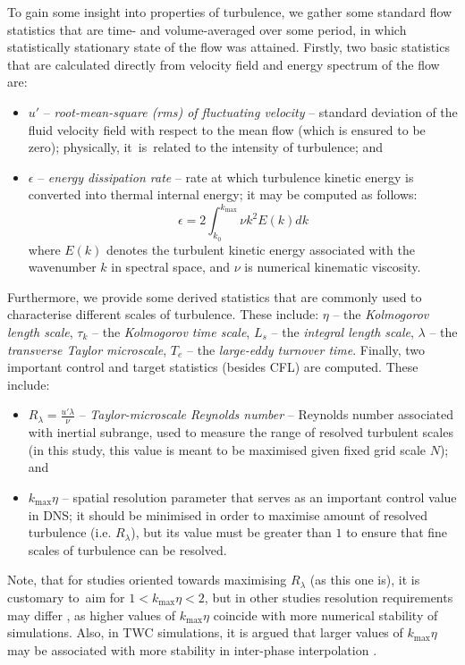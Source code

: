 \documentclass{pracamgren}
\begin{document}
To gain some insight into properties of turbulence, we gather some standard flow statistics that are time- and volume-averaged over some period, in which statistically stationary state of the flow was attained.
Firstly, two basic statistics that are calculated directly from velocity field and energy spectrum of the flow are: 
\begin{itemize}
\item $u'$ -- \emph{root-mean-square (rms) of fluctuating velocity} -- standard deviation of the fluid velocity field with respect to the mean flow (which is ensured to be zero); physically, it~is~related to the intensity of turbulence; and
\item $\epsilon$ -- \emph{energy dissipation rate} -- rate at which turbulence kinetic energy is converted into thermal internal energy; it may be computed as follows:
\begin{equation}
\epsilon  = 2 \int_{k_{0}}^{k_{\max}} \nu k^{2} E(k) dk
\label{eqn:eps}
\end{equation}
where $E(k)$ denotes the turbulent kinetic energy associated with the wavenumber $k$ in spectral space, and $\nu$ is numerical kinematic viscosity.  
\end{itemize}
Furthermore, we provide some derived statistics that are commonly used to characterise different scales of turbulence. These include: $\eta$ -- the \emph{Kolmogorov length scale}, $\tau_{k}$ -- the \emph{Kolmogorov time scale}, $L_{s}$ -- the \emph{integral length scale}, $\lambda$ -- the \emph{transverse Taylor microscale}, $T_{e}$ -- the \emph{large-eddy turnover time}.
Finally, two important control and target statistics (besides CFL) are computed. These include:
\begin{itemize}
\item $R_{\lambda} = \frac{u' \lambda}{\nu}$ -- \emph{Taylor-microscale Reynolds number} -- Reynolds number associated with inertial subrange, used to measure the range of resolved turbulent scales (in this study, this value is meant to be maximised given fixed grid scale $N$); and
\item $k_{\max} \eta$ -- spatial resolution parameter that serves as an important control value in DNS; it should be minimised in order to maximise amount of resolved turbulence (i.e. $R_{\lambda}$), but its value must be greater than $1$ to ensure that fine scales of turbulence can be resolved.
\end{itemize}
Note, that for studies oriented towards maximising $R_{\lambda}$ (as this one is), it is customary to~aim for $1 < k_{\max} \eta < 2$, but in other studies resolution requirements may differ \parencite{Buaria2019}, as higher values of $k_{\max} \eta$ coincide with more numerical stability of simulations.
Also, in TWC simulations, it is argued that larger values of $k_{\max} \eta$ may be associated with more stability in inter-phase interpolation \parencite[see][]{Rosa2020}.   
\end{document}
